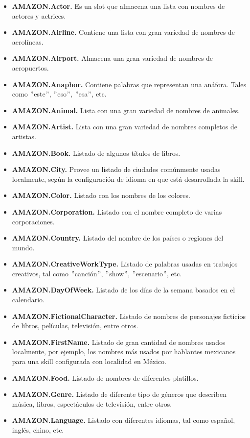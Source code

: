 \begin{itemize}
  \item \textbf{AMAZON.Actor.} Es un slot que almacena una lista con nombres de actores y actrices.
  \item \textbf{AMAZON.Airline.} Contiene una lista con gran variedad de nombres de aerolíneas.
  \item \textbf{AMAZON.Airport.} Almacena una gran variedad de nombres de aeropuertos.
  \item \textbf{AMAZON.Anaphor.} Contiene palabras que representan una anáfora. Tales como $"$este$"$, $"$eso$"$, $"$esa$"$, etc.
  \item \textbf{AMAZON.Animal.} Lista con una gran variedad de nombres de animales.
  \item \textbf{AMAZON.Artist.} Lista con una gran variedad de nombres completos de artistas.
  \item \textbf{AMAZON.Book.} Listado de algunos títulos de libros.
  \item \textbf{AMAZON.City.} Provee un listado de ciudades comúnmente usadas localmente, según la configuración de idioma en que está desarrollada la skill.
  \item \textbf{AMAZON.Color.} Listado con los nombres de los colores.
  \item \textbf{AMAZON.Corporation.} Listado con el nombre completo de varias corporaciones.
  \item \textbf{AMAZON.Country.} Listado del nombre de los países o regiones del mundo.
  \item \textbf{AMAZON.CreativeWorkType.} Listado de palabras usadas en trabajos creativos, tal como $"$canción$"$, $"$show$"$, $"$escenario$"$, etc.
  \item \textbf{AMAZON.DayOfWeek.} Listado de los días de la semana basados en el calendario.
  \item \textbf{AMAZON.FictionalCharacter.} Listado de nombres de personajes ficticios de libros, películas, televisión, entre otros.
  \item \textbf{AMAZON.FirstName.} Listado de gran cantidad de nombres usados localmente, por ejemplo, los nombres más usados por hablantes mexicanos para una skill configurada con localidad en México.
  \item \textbf{AMAZON.Food.} Listado de nombres de diferentes platillos.
  \item \textbf{AMAZON.Genre.} Listado de diferente tipo de géneros que describen música, libros, espectáculos de televisión, entre otros.
  \item \textbf{AMAZON.Language.} Listado con diferentes idiomas, tal como español, inglés, chino, etc.

\end{itemize}
